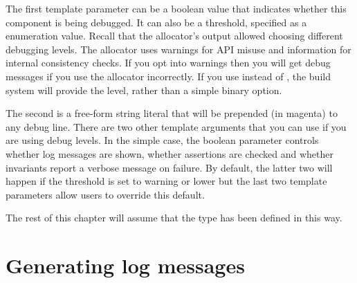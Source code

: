 \codelisting[filename=examples/debug_helpers/example.cc,marker=debug_type,label=lst:usingdebug,caption="Connecting the debug option to a debug type in code"]{}

The first template parameter can be a boolean value that indicates whether this component is being debugged.
It can also be a threshold, specified as a  enumeration value.
Recall that the allocator's output allowed choosing different debugging levels.
The allocator uses warnings for API misuse and information for internal consistency checks.
If you opt into warnings then you will get debug messages if you use the allocator incorrectly.
If you use  instead of , the build system will provide the level, rather than a simple binary option.

The second is a free-form string literal that will be prepended (in magenta) to any debug line.
There are two other template arguments that you can use if you are using debug levels.
In the simple case, the boolean parameter controls whether log messages are shown, whether assertions are checked and whether invariants report a verbose message on failure.
By default, the latter two will happen if the threshold is set to warning or lower but the last two template parameters allow users to override this default.

The rest of this chapter will assume that the  type has been defined in this way.

\section{Generating log messages}

